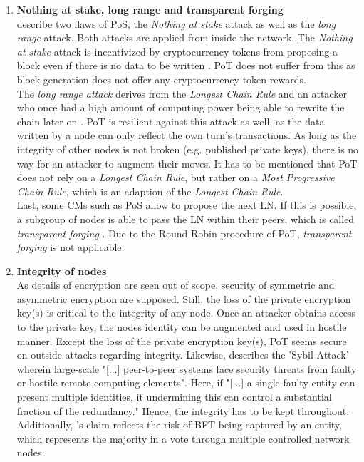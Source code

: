 \begin{enumerate}
	\item \textbf{Nothing at stake, long range and transparent forging} \\
	\cite{Lin.2017} describe two flaws of \gls{PoS}, the \textit{Nothing at stake} attack as well as the \textit{long range} attack.
	Both attacks are applied from inside the network.
	The \textit{Nothing at stake} attack is incentivized by cryptocurrency tokens from proposing a block even if there is no data to be written \cite[301-302]{Lin.2017}.
	\gls{PoT} does not suffer from this as block generation does not offer any cryptocurrency token rewards. \\
	The \textit{long range attack} derives from the \textit{Longest Chain Rule} and an attacker
	who once had a high amount of computing power being able to rewrite the chain later on \cite[302-303]{Lin.2017}.
	\gls{PoT} is resilient against this attack as well, as the data written by a node can only reflect the own turn's transactions.
	As long as the integrity of other nodes is not broken (e.g. published private keys), there is no way for an attacker to augment their moves.
	It has to be mentioned that \gls{PoT} does not rely on a \textit{Longest Chain Rule}, but rather on a \textit{Most Progressive Chain Rule}, which is an adaption of the \textit{Longest Chain Rule}. \\
	Last, some \gls{CM}s such as \gls{PoS} allow to propose the next \gls{LN}.
	If this is possible, a subgroup of nodes is able to pass the \gls{LN} within their peers, which is called \textit{transparent forging} \cite[302]{Lin.2017}.
	Due to the Round Robin procedure of \gls{PoT}, \textit{transparent forging} is not applicable.
	
	\item \textbf{Integrity of nodes} \\
	As details of encryption are seen out of scope, security of symmetric and asymmetric encryption are supposed.
	Still, the loss of the private encryption key(s) is critical to the integrity of any node.
	Once an attacker obtains access to the private key, the nodes identity can be augmented and used in hostile manner.
	Except the loss of the private encryption key(s), \gls{PoT} seems secure on outside attacks regarding integrity.
	Likewise, \citet[251]{Douceur.2002} describes the 'Sybil Attack' wherein large-scale "[...] peer-to-peer systems face security threats from faulty or hostile remote computing elements".
	Here, if "[...] a single faulty entity can present multiple identities, it undermining this can control a substantial fraction of the redundancy." \cite[251]{Douceur.2002}
	Hence, the integrity has to be kept throughout.
	Additionally, \citet{Douceur.2002}'s claim reflects the risk of \gls{BFT} being captured by an entity,
	which represents the majority in a vote through multiple controlled network nodes.
	

\end{enumerate}
